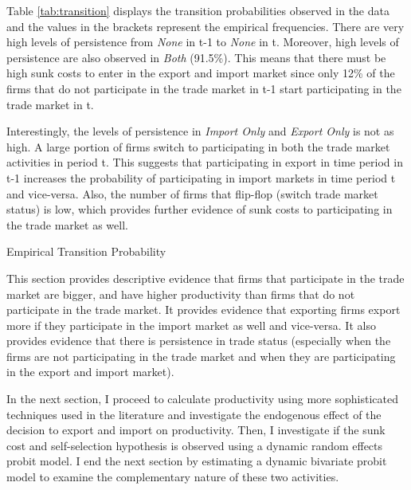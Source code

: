 \documentclass[12pt]{article}
\begin{document}
Table \ref{tab:transition} displays the transition probabilities
observed in the data  and the values in the brackets represent the
empirical frequencies.  There are very high levels of persistence from
\textit{None} in t-1 to \textit{None} in t. Moreover,   high levels of persistence
are also observed in  \textit{Both}  (91.5\%). This means that there must be high sunk
costs to enter in the export and import market since only 12\% of the
firms  that do not participate in the trade market in t-1 start
participating in the trade market in t.

Interestingly, the levels of
persistence in \textit{Import Only} and \textit{Export Only}  is not
as high. A large portion of firms switch to participating in both the trade market
activities in period t. This suggests that participating in export in time
period in t-1 increases the probability of participating in import  markets in time period
t and vice-versa. Also, the number of firms that flip-flop (switch
trade market status) is low, which provides further evidence of sunk costs
to participating in the trade market as well. 

\begin{table}[H]
\begin{center}

\caption{Empirical Transition Probability}
\label{tab:transition}

\end{center}

\end{table}


This section provides descriptive evidence that firms that participate
in the trade market are bigger, and have higher
productivity than firms that do not participate in the trade
market. It provides evidence that exporting firms export more if they
participate in the import market as well and vice-versa. It also
provides evidence that there is persistence in trade status
(especially when the firms are not participating in the trade market
and when they are participating in the export and import market). 

In the next section, I proceed to calculate productivity using more
sophisticated techniques used in the literature and investigate the endogenous effect
of the decision to export and import on productivity. Then, I investigate if the
sunk cost  and self-selection hypothesis is observed using a
dynamic random effects probit model. I end the next section by
estimating a dynamic bivariate probit model to examine the complementary
nature of these two activities. 
\end{document}
